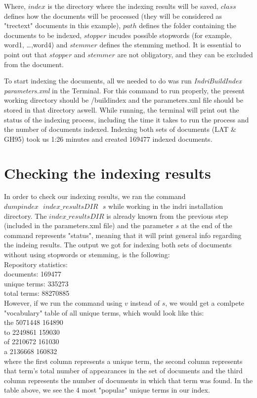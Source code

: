 \documentclass[letterpaper,11pt]{article}
\begin{document}
Where, $index$ is the directory where the indexing results will be saved, $class$ defines how the documents will be processed (they will be considered as "trectext" documents in this example), $path$ defines the folder containing the documents to be indexed, $stopper$ incudes possible stopwords (for example, word1, \dots ,word4) and $stemmer$ defines the stemming method. It is essential to point out that $stopper$ and $stemmer$ are not obligatory, and they can be excluded from the document. 

To start indexing the documents, all we needed to do was run \textit{IndriBuildIndex parameters.xml} in the Terminal. For this command to run properly, the present working directory should be /buildindex and the parameters.xml file should be stored in that directory aswell.	While running, the terminal will print out the status of the indexing process, including the time it takes to run the process and the number of documents indexed. Indexing both sets of documents (LAT \& GH95) took us 1:26 minutes and created 169477 indexed documents.

\section{Checking the indexing results}

In order to check our indexing results, we ran the command $dumpindex \text{ } index\_resultsDIR \text{ } s$ while working in the indri installation directory. The $index\_resultsDIR$ is already known from the previous step (included in the parameters.xml file) and the parameter $s$ at the end of the command represents "status", meaning that it will print general info regarding the indeing results. The output we got for indexing both sets of documents without using stopwords or stemming, is the following:\\
Repository statistics:\\
documents:	169477\\
unique terms:	335273\\
total terms:	88270885\\

However, if we run the command using $v$ instead of $s$, we would get a comlpete "vocabulary" table of all unique terms, which would look like this: \\
the 5071448 164890\\
to 2249861 159030\\
of 2210672 161030\\
a 2136668 160832\\
where the first column represents a unique term, the second column represents that term's total number of appearances in the set of documents and the third column represents the number of documents in which that term was found. In the table above, we see the 4 most "popular" unique terms in our index.
\end{document}
